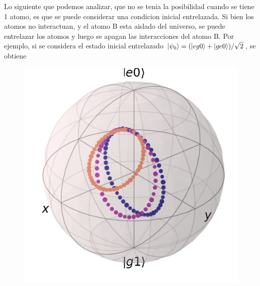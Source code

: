 Lo siguiente que podemos analizar, que no se tenia la posibilidad cuando se tiene 1 atomo, es que se puede considerar una condicion inicial entrelazada. Si bien los atomos no interactuan, y el atomo B esta aislado del universo, se puede entrelazar los atomos y luego se apagan las interacciones del atomo B. Por ejemplo, si se considera el estado inicial entrelazado $\ket{\psi_0}=(\ket{eg0}+\ket{ge0})/\sqrt{2}$, se obtiene 
\begin{figure}[H]
    \begin{minipage}[c]{0.67\textwidth}
        \includegraphics[width=\textwidth]{figuras/ch4/eg0+ge0 bloch AC a=0 d=2.0 x=0.0 k=0.0 J=0.0 gamma=0.0 p=0.0.png}
    \end{minipage}\hfill
    \begin{minipage}[c]{0.3\textwidth}
    \caption{
         } \label{fig4:bloch delta}
  \end{minipage}
\end{figure}

